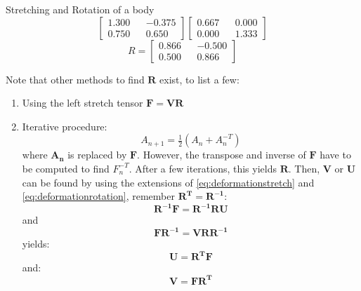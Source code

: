 \begin{example}{Stretching and Rotation of a body}
$${\begin{bmatrix}
            1.300 && -0.375 \\
            0.750 && 0.650
        \end{bmatrix} 
        \begin{bmatrix}
            0.667 && 0.000 \\
            0.000 && 1.333
        \end{bmatrix}}
    $$
    $$
        R =
        \begin{bmatrix}
            0.866 && -0.500 \\
            0.500 && 0.866
        \end{bmatrix}
    $$
        
\end{example}
Note that other methods to find $\mathbf{R}$ exist, to list a few:
\begin{enumerate}
    \item Using the left stretch tensor $\mathbf{F = V R}$
    \item Iterative procedure:
    $$
        A_{n+1} = \tfrac{1}{2}(A_n + A_n^{-T})
    $$
    where $\mathbf{A_n}$ is replaced by $\mathbf{F}$. However, the transpose and inverse of $\mathbf{F}$ have to be computed to find $F_n^{-T}$. After a few iterations, this yields $\mathbf{R}$. Then, $\mathbf{V}$ or $\mathbf{U}$ can be found by using the extensions of \cref{eq:deformationstretch} and \cref{eq:deformationrotation}, remember $\mathbf{R^T = R^{-1}}$:
    $$
        \mathbf{R^{-1} F = R^{-1} R U}
    $$
    and 
    $$
        \mathbf{F R^{-1} = V R R^{-1}}
    $$
    yields:
    \begin{equation}
        \mathbf{U = R^T F}
    \end{equation}
    and:
    \begin{equation}
        \mathbf{V = F R^T}
    \end{equation}
\end{enumerate}
















